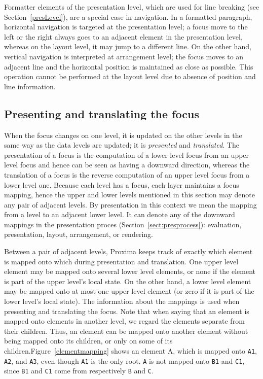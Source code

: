 
Formatter elements of the presentation level, which are used for line breaking (see Section~\ref{presLevel}), are a special case in navigation. In a formatted paragraph, horizontal navigation is targeted at the presentation level; a focus move to the left or the right always goes to an adjacent element in the presentation level, whereas on the layout level, it may jump to a different line. On the other hand, vertical navigation is interpreted at arrangement level; the focus moves to an adjacent line and the horizontal position is maintained as close as possible. This operation cannot be performed at the layout level due to absence of position and line information. 
 
 
%									
\subsection{Presenting and translating the focus}

When the focus changes on one level, it is updated on the other levels in the same way as the data levels are updated; it is {\em presented} and {\em translated}. The presentation of a focus is the computation of a lower level focus from an upper level focus and hence can be seen as having a downward direction, whereas the translation of a focus is the reverse computation of an upper level focus from a lower level one. Because each level has a focus, each layer maintains a focus mapping, hence the upper and lower levels mentioned in this section may denote any pair of adjacent levels. By presentation in this context we mean the mapping from a level to an adjacent lower level. It can denote any of the downward mappings in the presentation proces (Section~\ref{sect:presprocess}): evaluation, presentation, layout, arrangement, or rendering.

Between a pair of adjacent levels, Proxima keeps track of exactly which element is mapped onto which during presentation and translation.  One upper level element may be mapped onto several lower level elements, or none if the element is part of the upper level's local state. On the other hand, a lower level element may be mapped onto at most one upper level element (or zero if it is part of the lower level's local state). The information about the mappings is used when presenting and translating the focus. Note that when saying that an element is mapped onto elements in another level, we regard the elements separate from their children. Thus, an element can be mapped onto another element without being mapped onto its children, or only on some of its children.Figure~\ref{elementmapping} shows an element A, which is mapped onto \verb|A1|, \verb|A2|, and \verb|A3|, even though \verb|A1| is the only root. \verb|A| is not mapped onto \verb|B1| and \verb|C1|, since \verb|B1| and \verb|C1| come from respectively \verb|B| and \verb|C|.  

